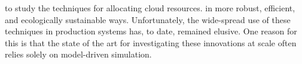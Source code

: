 \begin{comment}
[9] R. N. Calheiros, R. Ranjan, A. Beloglazov, C. A. D. Rose, and R. Buyya, “CloudSim: a toolkit for modeling and simulation of cloud computing environments and evaluation of resource provisioning algo- rithms,” Software: Practice and Experience, vol. 41, no. 1, pp. 23–50,
2011.
[10] D. Kliazovich, P. Bouvry, and S. U. Khan, “GreenCloud: a packet-level simulator of energy-aware cloud computing data centers,” The Journal of Supercomputing, vol. 62, no. 3, pp. 1263–1283, 2012.

[11] B. Wickremasinghe, R. N. Calheiros, and R. Buyya, “Cloudanalyst: A CloudSim-based visual modeller for analysing cloud computing environments and applications,” in Advanced Information Networking
and Applications (AINA), 2010 24th IEEE International Conference on.
IEEE, 2010, pp. 446–452.

[12] S. K. Garg and R. Buyya, “Networkcloudsim: Modelling parallel applications in cloud simulations,” in Utility and Cloud Computing
(UCC), 2011 Fourth IEEE International Conference on. IEEE, 2011,
pp. 105–113.

[13] M. Tighe, G. Keller, M. Bauer, and H. Lutfiyya, “DCSim: A data centre simulation tool for evaluating dynamic virtualized resource management,” in Network and service management (cnsm), 2012 8th
international conference and 2012 workshop on systems virtualiztion
management (svm), Oct 2012, pp. 385–392.

[14] S. K. S. Gupta, R. Gilbert, A. Banerjee, Z. Abbasi, T. Mukherjee, and G. Varsamopoulos, “GDCSim: A tool for analyzing Green Data Center design and resource management techniques,” in Green Computing
Conference and Workshops (IGCC), 2011 International, July 2011, pp.
1–8.
\end{comment}


 to  study the techniques for  allocating  cloud  resources. in  more  robust,  efficient,  and
ecologically  sustainable  ways. Unfortunately,  the  wide-spread  use of  these
techniques in production systems has, to  date, remained elusive. One reason for
this is that the  state of the art for investigating  these innovations at scale
often  relies solely  on model-driven  simulation.



